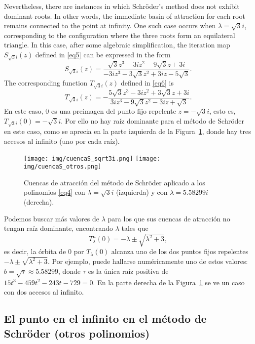 \IfFileExists{aims.cls}{\documentclass{aims}}{\documentclass[11pt]{article}}
\numberwithin{equation}{section}
\newcommand{\includegraphics}[2][]{%
  }%
\renewcommand{\includegraphics}[2][]{%
  }%
\theoremstyle{thmstyleone}%
\theoremstyle{thmstyletwo}%
\theoremstyle{thmstylethree}%
\begin{document}
Nevertheless, there are instances in which Schröder's method does not exhibit dominant roots. In other words, the immediate basin of attraction for each root remains connected to the point at infinity. One such case occurs when $\lambda=\sqrt{3}i$, corresponding to the configuration where the three roots form an equilateral triangle. In this case, after some algebraic simplification, the iteration map $S_{\sqrt{3}i}(z)$ defined in \eqref{eq5} can be expressed in the form
$$
S_{\sqrt{3}i}(z)=\frac{\sqrt{3} z^3-3 i z^2-9 \sqrt{3} z+3 i}{-3 i z^3-3 \sqrt{3} z^2+3 i z-5 \sqrt{3}}.
$$
The corresponding function $T_{\sqrt{3}i}(z)$ defined in \eqref{eq6} is
$$
T_{\sqrt{3}i}(z)=-\frac{5 \sqrt{3} z^3-3 i z^2+3 \sqrt{3} z+3 i}{3 i z^3-9 \sqrt{3} z^2-3 i z+\sqrt{3}}.
$$
En este caso, $0$ es una preimagen del punto fijo repelente $z=- \sqrt{3}i$, esto es, $T_{\sqrt{3}i}(0)=- \sqrt{3}i$. Por ello no hay raíz dominante para el método de Schr\"oder en este caso, como se aprecia en la parte izquierda de la Figura~\ref{fig5}, donde hay tres accesos al infinito (uno por cada raíz).

\begin{figure}[h]%
\centering
\texttt{[image: img/cuencaS\_sqrt3i.png]}\quad
\texttt{[image: img/cuencaS\_otros.png]}
\caption{Cuencas de atracción del método de Schr\"oder aplicado a los polinomios \eqref{eq4} con $\lambda=\sqrt{3}i$ (izquierda) y con $\lambda=5.58299i$ (derecha).}
\label{fig5}
\end{figure}

Podemos buscar más valores de $\lambda$ para los que sus cuencas de atracción no tengan raíz dominante, encontrando $\lambda$ tales que 
\begin{equation*}
T^n_\lambda(0)=-\lambda\pm\sqrt{\lambda^2+3},
\end{equation*}
es decir, la órbita de 0 por $T_\lambda(0)$ alcanza uno de los dos puntos fijos repelentes $-\lambda\pm\sqrt{\lambda^2+3}$. Por ejemplo, puede hallarse numéricamente uno de estos valores: $b=\sqrt{\tau}\approx 5.58299$, donde $\tau$ es la única raíz positiva de $15t^3-459t^2-243t-729=0$. En la parte derecha de la Figura~\ref{fig5} se ve un caso con dos accesos al infinito.



\subsection{El punto en el infinito en el método de Schr\"oder (otros polinomios)}
\end{document}

